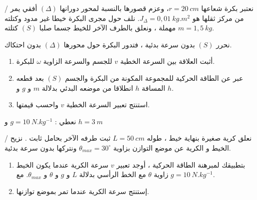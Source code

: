 \documentclass[12pt,a4paper]{article}
\begin{document}
					\begin{exercice}{}/
					نعتبر بكرة شعاعها
					$r=20\ cm$، 
					وعزم قصورها
				بالنسبة لمحور دورانها
				$(\Delta)$
				أفقي يمر من مركز ثقلها هو
				$J_{\Delta}	 = 0,01\ kg.m^{2}$.
نلف حول مجرى البكرة خيطا
غير مدود وكتلته مهملة ، ونعلق بالطرف الآخر للخيط
	جسما صلبا
	$(S)$
	كتلته
	$m=1,5\ kg$.\\
\begin{minipage}[c]{0.6\linewidth}
نحرر
	$(S)$
بدون سرعة بدئية ، فتدور
	البكرة حول محورها
	$(\Delta)$
	بدون احتكاك.
	\begin{enumerate}
	\item أثبت العلاقة بين السرعة
الخطية
$v$
للجسم والسرعة
الزاوية
$\omega$
للبكرة.
\item عبر عن الطاقة الحركية للمجموعة المكونة من البكرة
والجسم
$(S)$
بعد قطعه المسافة
$h$
انطلاقا من موضعه
البدئي بدلالة
$m$
و
$g$
و
$h$.
\item استنتج تعبير السرعة الخطية
$v$
واحسب قيمتها.
	\end{enumerate}
	نعطي :
	$g=10\ N.kg^{-1}$
	و
	$h=3\ m$
				\end{minipage}
					\begin{minipage}[c]{0.38\linewidth}
\begin{flushleft}
\end{flushleft}
\end{minipage}
					\end{exercice}%
					\begin{exercice}{}/
					نعلق كرية صغيرة بنهاية خيط ، طوله
$L=50\ cm$				
					ثبت
		طرفه الآخر بحامل ثابت . نزيح الخيط و الكرية عن موضع
التوازن بزاوية
$\theta_{max} = 30^{\circ}$
ونتركها بدون سرعة بدئية.
\begin{enumerate}
\item بتطبيقك لمبرهنة الطاقة الحركية ، أوجد تعبير
$v$
سرعة الكرية عندما يكون الخيط زاوية
$\theta$
مع الخط الرأسي
بدلالة
$L$
و
$g$
 و
 $\theta$
  و
$\theta_{max}$.
مع
$g=10\ N.kg^{-1}$.
\item إستنتج سرعة الكرية عندما تمر بموضع توازنها.
\end{enumerate}
					\end{exercice}%
\end{document}
